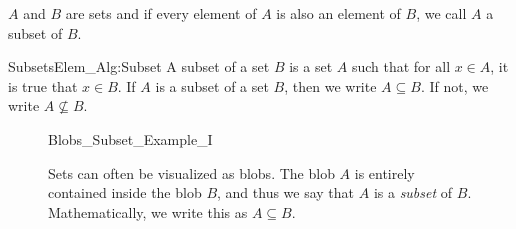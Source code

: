 \documentclass[crop=false,class=book,oneside]{standalone}
\begin{document}
            $A$ and $B$ are sets and if every
            element of $A$ is also an element of $B$,
            we call $A$ a subset of $B$.
            \begin{fdefinition}{Subsets}{Elem_Alg:Subset}
                A subset of a set $B$ is a set $A$
                such that for all $x\in{A}$,
                it is true that $x\in{B}$. If $A$ is a
                subset of a set $B$, then we write
                $A\subseteq{B}$. If not, we write
                $A\not\subseteq{B}$.
            \end{fdefinition}
            \begin{figure}[H]
                \centering
                \captionsetup{type=figure}
                {Blobs_Subset_Example_I}
                \caption[Visual for Subsets]
                        {Sets can often be visualized as blobs.
                         The blob $A$ is entirely contained
                         inside the blob $B$, and thus we say
                         that $A$ is a
                         \textit{subset} of $B$. Mathematically,
                         we write this
                         as $A\subseteq{B}$.}
                \label{fig:Elem_Alg_Subsets_Example}
            \end{figure}
\end{document}
